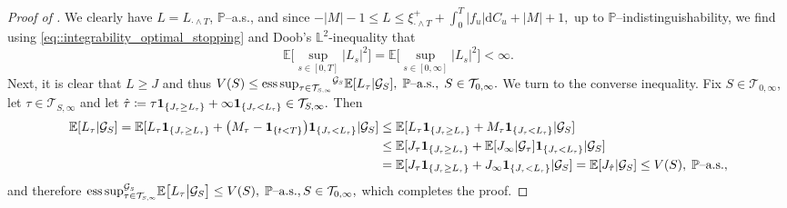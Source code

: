 \documentclass[10pt]{article} %
\newcommand\cG{\mathcal G}
\newcommand\cT{\mathcal T}
\newcommand{\smalltext}[1]{\text{\fontsize{4}{4}\selectfont$#1$}}
\def \E{\mathbb{E}}
\def \L{\mathbb{L}}
\def \P{\mathbb{P}}
\def\d{\mathrm{d}}
\DeclareMathOperator*{\esssup}{ess\,sup}
\begin{document}
\begin{proof}[Proof of ]
	We clearly have $L = L_{\cdot \land T}$, $\P$--a.s., and since $-|M| - 1 \leq L \leq \xi_{\cdot \land T}^+ + \int_0^T |f_u| \d C_u + |M| + 1,$ up to $\P$--indistinguishability, we find using \eqref{eq::integrability_optimal_stopping} and Doob's $\L^2$-inequality that
	\begin{equation*}
		\E\bigg[\sup_{s \in [0,T]} |L_s|^2\bigg] = \E\bigg[\sup_{s \in [0,\infty]} |L_s|^2\bigg] < \infty.
	\end{equation*}
	Next, it is clear that $L \geq J$ and thus $V(S) \leq {\esssup_{\tau \in \cT_{\smalltext{S}\smalltext{,}\smalltext{\infty}}}}^{\cG_\smalltext{S}} \E[L_\tau |\cG_S], \; \text{$\P$--a.s.}, \; S \in \cT_{0,\infty}.$ We turn to the converse inequality. Fix $S \in \cT_{0,\infty}$, let $\tau \in \cT_{S,\infty}$ and let $\hat\tau \coloneqq \tau \mathbf{1}_{\{J_\smalltext{\tau} \geq L_\smalltext{\tau}\}} + \infty \mathbf{1}_{\{J_\smalltext{\tau} < L_\smalltext{\tau}\}} \in \cT_{S,\infty}.$ Then
	\begin{align*}
		\E[L_{\tau}| \cG_S] = \E[L_{\tau} \mathbf{1}_{\{J_\smalltext{\tau} \geq L_\smalltext{\tau}\}} + \big(M_\tau - \mathbf{1}_{\{t < T\}}\big)\mathbf{1}_{\{J_\smalltext{\tau} < L_\smalltext{\tau}\}}| \cG_S]  
		&\leq \E[L_\tau \mathbf{1}_{\{J_\smalltext{\tau} \geq L_\smalltext{\tau}\}} + M_\tau\mathbf{1}_{\{J_\smalltext{\tau} < L_\smalltext{\tau}\}}| \cG_S] \\
		&\leq \E[J_\tau \mathbf{1}_{\{J_\smalltext{\tau} \geq L_\smalltext{\tau}\}} + \E[J_\infty | \cG_\tau]\mathbf{1}_{\{J_\smalltext{\tau} < L_\smalltext{\tau}\}}| \cG_S] \\
		&= \E[J_\tau \mathbf{1}_{\{J_\smalltext{\tau} \geq L_\smalltext{\tau}\}} + J_\infty\mathbf{1}_{\{J_\smalltext{\tau} < L_\smalltext{\tau}\}}| \cG_S] = \E[J_{\hat\tau}| \cG_S] \leq V(S), \; \text{$\P$--a.s.},
	\end{align*}
	and therefore ${\esssup^{\cG_\smalltext{S}}_{\tau \in \cT_{\smalltext{S}\smalltext{,}\smalltext{\infty}}}} \E\big[ L_\tau \big| \cG_S\big] \leq V(S), \; \text{$\P$--a.s.}, S \in \cT_{0,\infty},$ which completes the proof.
\end{proof}
\end{document}
